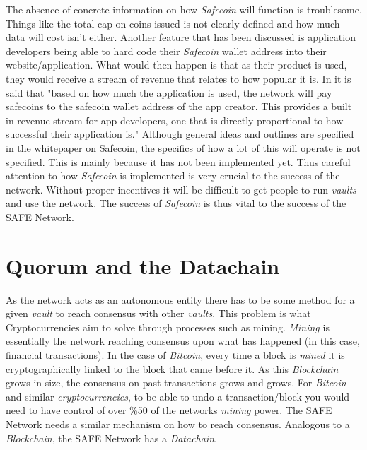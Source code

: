The absence of concrete information on how \textit{Safecoin} will function is troublesome. Things like the total cap on coins issued is not clearly defined and how much data will cost isn't either. Another feature that has been discussed is application developers being able to hard code their \textit{Safecoin} wallet address into their website/application. What would then happen is that as their product is used, they would receive a stream of revenue that relates to how popular it is. In \cite{lambert2015safecoin} it is said that "based on how much the application is used, the network will pay safecoins to the safecoin wallet address of the app creator. This provides a built in revenue stream for app developers, one that is directly proportional to how successful their application is." Although general ideas and outlines are specified in the whitepaper on Safecoin, the specifics of how a lot of this will operate is not specified. This is mainly because it has not been implemented yet. Thus careful attention to how \textit{Safecoin} is implemented is very crucial to the success of the network. Without proper incentives it will be difficult to get people to run \textit{vaults} and use the network. The success of \textit{Safecoin} is thus vital to the success of the SAFE Network.

\section{Quorum and the Datachain}
\label{sec:datachain}

As the network acts as an autonomous entity there has to be some method for a given \textit{vault} to reach consensus with other \textit{vaults}. This problem is what Cryptocurrencies aim to solve through processes such as mining. \textit{Mining} is essentially the network reaching consensus upon what has happened (in this case, financial transactions). In the case of \textit{Bitcoin}, every time a block is \textit{mined} it is cryptographically linked to the block that came before it. As this \textit{Blockchain} grows in size, the consensus on past transactions grows and grows. For \textit{Bitcoin} and similar \textit{cryptocurrencies}, to be able to undo a transaction/block you would need to have control of over \%50 of the networks \textit{mining} power. The SAFE Network needs a similar mechanism on how to reach consensus. Analogous to a \textit{Blockchain}, the SAFE Network has a \textit{Datachain}. 

